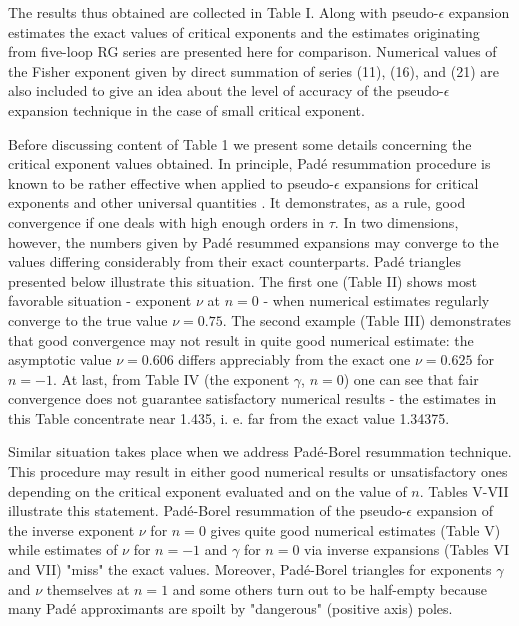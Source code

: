 \documentclass[preprint,preprintnumbers,amsmath,amssymb]{revtex4}
\begin{document}
The results thus obtained are collected in Table I. Along with
pseudo-$\epsilon$ expansion estimates the exact values of critical
exponents and the estimates originating from five-loop RG series
\cite{OS2000} are presented here for comparison. Numerical values
of the Fisher exponent given by direct summation of series (11),
(16), and (21) are also included to give an idea about the level
of accuracy of the pseudo-$\epsilon$ expansion technique in the
case of small critical exponent.

Before discussing content of Table 1 we present some details concerning the critical
exponent values obtained. In principle, Pad\'e resummation procedure is known to be
rather effective when applied to pseudo-$\epsilon$ expansions for critical exponents
and other universal quantities \cite{FHY2000, HID2004, COPS2004, S2005}.
It demonstrates, as a rule, good convergence if one deals with high enough orders in
$\tau$. In two dimensions, however, the numbers given by Pad\'e resummed expansions
may converge to the values differing considerably from their exact counterparts.
Pad\'e triangles presented below illustrate this situation. The first one (Table II)
shows most favorable situation - exponent $\nu$ at $n = 0$ - when numerical
estimates regularly converge to the true value $\nu = 0.75$. The second example
(Table III) demonstrates that good convergence may not result in quite good numerical
estimate: the asymptotic value $\nu = 0.606$ differs appreciably from the exact one
$\nu = 0.625$ for $n = -1$. At last, from Table IV (the exponent $\gamma$, $n = 0$)
one can see that fair convergence does not guarantee satisfactory numerical results
- the estimates in this Table concentrate near 1.435, i. e. far from the exact value
1.34375.

Similar situation takes place when we address Pad\'e-Borel
resummation technique. This procedure may result in either good
numerical results or unsatisfactory ones depending on the critical
exponent evaluated and on the value of $n$. Tables V-VII
illustrate this statement. Pad\'e-Borel resummation of the
pseudo-$\epsilon$ expansion of the inverse exponent $\nu$ for $n =
0$ gives quite good numerical estimates (Table V) while estimates
of $\nu$ for $n = -1$ and $\gamma$ for $n = 0$ via inverse
expansions (Tables VI and VII) "miss" the exact values. Moreover,
Pad\'e-Borel triangles for exponents $\gamma$ and $\nu$ themselves
at $n = 1$ and some others turn out to be half-empty because many
Pad\'e approximants are spoilt by "dangerous" (positive axis)
poles.
\end{document}
